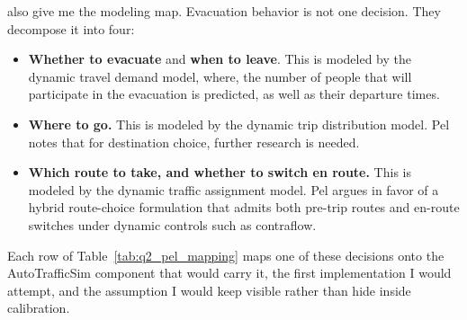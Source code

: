 \begin{bibunit}[plainnat]
\citet{pel2012evacuationbehavior} also give me the modeling map. Evacuation
behavior is not one decision. They decompose it into four:
\begin{itemize}
    \item \textbf{Whether to evacuate} and \textbf{when to leave}.
    This is modeled by the dynamic travel demand model, where, the number
    of people that will participate in the evacuation is predicted, as well
    as their departure times.
    \item \textbf{Where to go.} This is modeled by the dynamic trip
    distribution model. Pel notes that for destination choice, further
    research is needed.
    \item \textbf{Which route to take, and whether to switch en route.}
    This is modeled by the dynamic traffic assignment model. Pel argues in
    favor of a hybrid route-choice formulation that admits both pre-trip
    routes and en-route switches under dynamic controls such as contraflow.
\end{itemize}
Each row of Table~\ref{tab:q2_pel_mapping} maps one of these decisions onto
the AutoTrafficSim component that would carry it, the first implementation
I would attempt, and the assumption I would keep visible rather than hide
inside calibration.


\end{bibunit}
